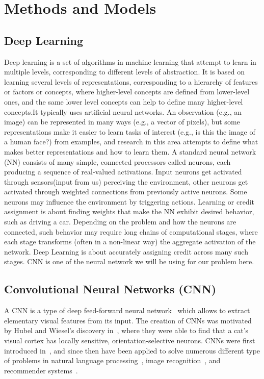 \section{Methods and Models}

\subsection{Deep Learning}
Deep learning is a set of algorithms in machine learning that attempt to learn in multiple levels, corresponding to different levels of abstraction. It is based on learning several levels of representations, corresponding to a hierarchy of features or factors or concepts, where higher-level concepts are defined from lower-level ones, and the same lower level concepts can help to define many higher-level concepts.It typically uses artificial neural networks. An observation (e.g., an image) can be represented in many ways (e.g., a vector of pixels), but some representations make it easier to learn tasks of interest (e.g., is this the image of a human face?) from examples, and research in this area attempts to define what makes better representations and how to learn them\cite{DeepLearning}.
A standard neural network (NN) consists of many simple, connected processors called neurons, each producing a sequence of real-valued activations. Input neurons get activated through sensors(input from us) perceiving the environment, other neurons get activated through weighted connections from previously active neurons. Some neurons may influence the environment by triggering actions.\cite{NeuralNetwork} Learning or credit assignment is about finding weights that make the NN exhibit desired behavior, such as driving a car. Depending on the problem and how the neurons are connected, such behavior may require long chains of computational stages, where each stage transforms (often in a non-linear way) the aggregate activation of the network. Deep Learning is about accurately assigning credit across many such stages. CNN is one of the neural network we will be using for our problem here.

\subsection{Convolutional Neural Networks (CNN)}

A CNN is a type of deep feed-forward neural network~\cite{cnn-star-galaxy} which allows to extract elementary visual features from its input. The creation of CNNs was motivated by Hubel and Wiesel's discovery in~\cite{hubel-wiesel-receptive-fields}, where they were able to find that a cat's visual cortex has locally sensitive, orientation-selective neurons. CNNs were first introduced in~\cite{Lecun99objectrecognition}, and since then have been applied to solve numerous different type of problems in  natural language processing~\cite{Collobert:2008:UAN:1390156.1390177}, image recognition~\cite{cnn-star-galaxy}, and recommender systems~\cite{NIPS2013_5004}.

